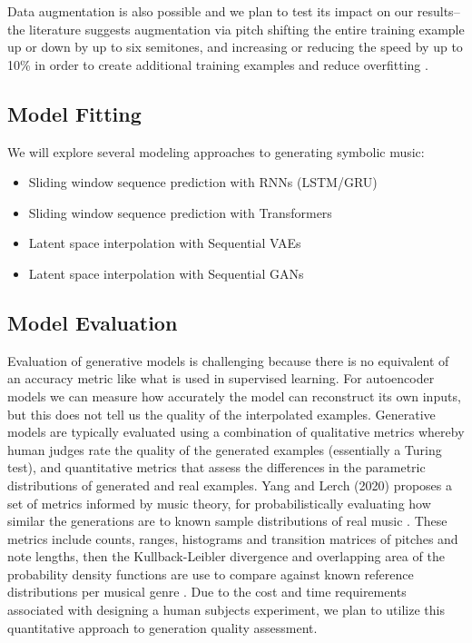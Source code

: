 \documentclass[sigconf,authorversion]{acmart}
\begin{document}
Data augmentation is also possible and we plan to test its impact on
our results--the literature suggests augmentation via pitch shifting
the entire training example up or down by up to six semitones, and
increasing or reducing the speed by up to 10\% in order to create
additional training examples and reduce overfitting
\cite{oore_this_2018}.

\subsection{Model Fitting}

We will explore several modeling approaches to generating symbolic music:

\begin{itemize}
  \item{Sliding window sequence prediction with RNNs (LSTM/GRU)}
  \item{Sliding window sequence prediction with Transformers}
  \item{Latent space interpolation with Sequential VAEs}
  \item{Latent space interpolation with Sequential GANs}
\end{itemize}

\subsection{Model Evaluation}

Evaluation of generative models is challenging because there is no
equivalent of an accuracy metric like what is used in supervised
learning. For autoencoder models we can measure how accurately the
model can reconstruct its own inputs, but this does not tell us the
quality of the interpolated examples. Generative models are typically
evaluated using a combination of qualitative metrics whereby human
judges rate the quality of the generated examples (essentially a
Turing test), and quantitative metrics that assess the differences in
the parametric distributions of generated and real examples. Yang and
Lerch (2020) proposes a set of metrics informed by music theory, for
probabilistically evaluating how similar the generations are to known
sample distributions of real music \cite{yang_evaluation_2020}. These
metrics include counts, ranges, histograms and transition matrices of
pitches and note lengths, then the Kullback-Leibler divergence and
overlapping area of the probability density functions are use to
compare against known reference distributions per musical genre
\cite{yang_evaluation_2020}. Due to the cost and time requirements
associated with designing a human subjects experiment, we plan to
utilize this quantitative approach to generation quality assessment.
\end{document}
